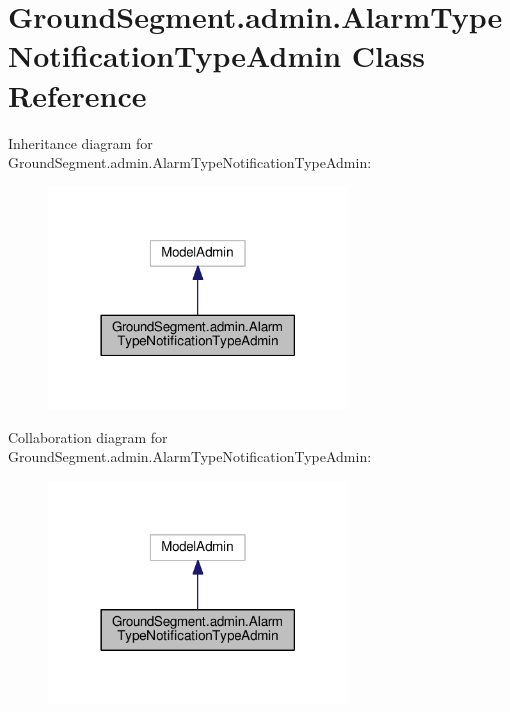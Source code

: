 \hypertarget{class_ground_segment_1_1admin_1_1_alarm_type_notification_type_admin}{}\section{Ground\+Segment.\+admin.\+Alarm\+Type\+Notification\+Type\+Admin Class Reference}
\label{class_ground_segment_1_1admin_1_1_alarm_type_notification_type_admin}


Inheritance diagram for Ground\+Segment.\+admin.\+Alarm\+Type\+Notification\+Type\+Admin\+:\nopagebreak
\begin{figure}[H]
\begin{center}
\leavevmode
\includegraphics[width=225pt]{class_ground_segment_1_1admin_1_1_alarm_type_notification_type_admin__inherit__graph}
\end{center}
\end{figure}


Collaboration diagram for Ground\+Segment.\+admin.\+Alarm\+Type\+Notification\+Type\+Admin\+:\nopagebreak
\begin{figure}[H]
\begin{center}
\leavevmode
\includegraphics[width=225pt]{class_ground_segment_1_1admin_1_1_alarm_type_notification_type_admin__coll__graph}
\end{center}
\end{figure}
